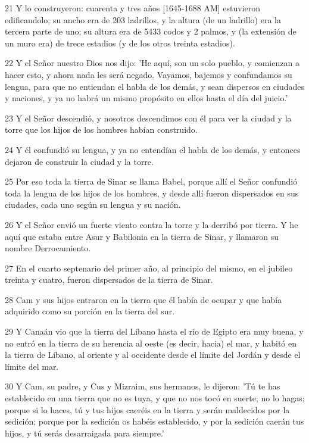 \par 21 Y lo construyeron: cuarenta y tres años [1645-1688 AM] estuvieron edificandolo; su ancho era de 203 ladrillos, y la altura (de un ladrillo) era la tercera parte de uno; su altura era de 5433 codos y 2 palmos, y (la extensión de un muro era) de trece estadios (y de los otros treinta estadios).
\par 22 Y el Señor nuestro Dios nos dijo: 'He aquí, son un solo pueblo, y comienzan a hacer esto, y ahora nada les será negado. Vayamos, bajemos y confundamos su lengua, para que no entiendan el habla de los demás, y sean dispersos en ciudades y naciones, y ya no habrá un mismo propósito en ellos hasta el día del juicio.'
\par 23 Y el Señor descendió, y nosotros descendimos con él para ver la ciudad y la torre que los hijos de los hombres habían construido.
\par 24 Y él confundió su lengua, y ya no entendían el habla de los demás, y entonces dejaron de construir la ciudad y la torre.
\par 25 Por eso toda la tierra de Sinar se llama Babel, porque allí el Señor confundió toda la lengua de los hijos de los hombres, y desde allí fueron dispersados ​​en sus ciudades, cada uno según su lengua y su nación.
\par 26 Y el Señor envió un fuerte viento contra la torre y la derribó por tierra. Y he aquí que estaba entre Asur y Babilonia en la tierra de Sinar, y llamaron su nombre Derrocamiento.
\par 27 En el cuarto septenario del primer año, al principio del mismo, en el jubileo treinta y cuatro, fueron dispersados ​​de la tierra de Sinar.
\par 28 Cam y sus hijos entraron en la tierra que él había de ocupar y que había adquirido como su porción en la tierra del sur.
\par 29 Y Canaán vio que la tierra del Líbano hasta el río de Egipto era muy buena, y no entró en la tierra de su herencia al oeste (es decir, hacia) el mar, y habitó en la tierra de Líbano, al oriente y al occidente desde el límite del Jordán y desde el límite del mar.
\par 30 Y Cam, su padre, y Cus y Mizraim, sus hermanos, le dijeron: 'Tú te has establecido en una tierra que no es tuya, y que no nos tocó en suerte; no lo hagas; porque si lo haces, tú y tus hijos caeréis en la tierra y serán maldecidos por la sedición; porque por la sedición os habéis establecido, y por la sedición caerán tus hijos, y tú serás desarraigada para siempre.'
